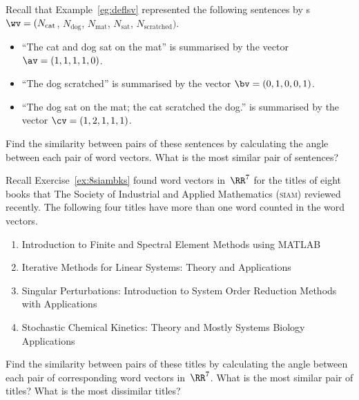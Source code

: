 \begin{exercise} \label{ex:} 
Recall that Example~\ref{eg:deflsv} represented the following sentences by s \(\wv=(N_{\text{cat}}\), \(N_{\text{dog}}\), \(N_{\text{mat}}\), \(N_{\text{sat}}\), \(N_{\text{scratched}})\).
\begin{itemize}
\item ``The cat and dog sat on the mat'' is summarised by the vector \(\av=(1,1,1,1,0)\).
\item ``The dog scratched'' is summarised by the vector \(\bv=(0,1,0,0,1)\).
\item  ``The dog sat on the mat; the cat scratched the dog.'' is summarised by the vector \(\cv=(1,2,1,1,1)\).
\end{itemize}
Find the similarity between pairs of these sentences by calculating the angle between each pair of word vectors.  
What is the most similar pair of sentences?

\end{exercise}



\begin{exercise} \label{ex:} 
Recall Exercise~\ref{ex:8siambks} found word vectors in~\(\RR^7\) for the titles of eight books that The Society of Industrial and Applied Mathematics (\textsc{siam}) reviewed recently.
The following four titles have more than one word counted in the word vectors.
\begin{enumerate}
\item Introduction to Finite and Spectral Element Methods using MATLAB
\item Iterative Methods for Linear Systems: Theory and Applications 
\item Singular Perturbations: Introduction to System Order Reduction Methods with Applications 
\item Stochastic Chemical Kinetics: Theory and Mostly Systems Biology Applications
\end{enumerate}
Find the similarity between pairs of these titles by calculating the angle between each pair of corresponding word vectors in~\(\RR^7\).  What is the most similar pair of titles?  What is the most dissimilar titles?

\end{exercise}



